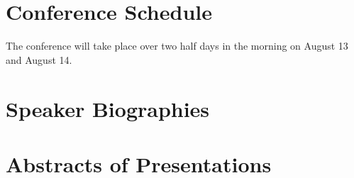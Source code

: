 \documentclass{article}
\begin{document}
\section*{Conference Schedule}
The conference will take place over two half days in the morning on August 13 and August 14.


%



\section*{Speaker Biographies}

\section*{Abstracts of Presentations}



\end{document}
